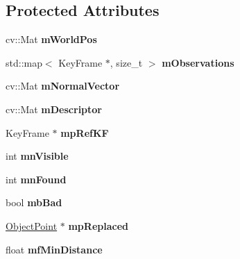 \subsection*{Protected Attributes}
\begin{DoxyCompactItemize}
\item 
\mbox{\label{classObjectPoint_ad860667222a3669a8feccb9ff73b2556}} 
cv\+::\+Mat {\bfseries m\+World\+Pos}
\item 
\mbox{\label{classObjectPoint_a62aca927653d3591f1211ccc06a6cffa}} 
std\+::map$<$ Key\+Frame $\ast$, size\+\_\+t $>$ {\bfseries m\+Observations}
\item 
\mbox{\label{classObjectPoint_a86e5ecd275a9594f8b72c35cb9735195}} 
cv\+::\+Mat {\bfseries m\+Normal\+Vector}
\item 
\mbox{\label{classObjectPoint_a3cf257ac63232c6dbd992defe6d16875}} 
cv\+::\+Mat {\bfseries m\+Descriptor}
\item 
\mbox{\label{classObjectPoint_a43e976a71483d1700aa48013874409dd}} 
Key\+Frame $\ast$ {\bfseries mp\+Ref\+KF}
\item 
\mbox{\label{classObjectPoint_a9465a617bd9530427916b13acdf85c46}} 
int {\bfseries mn\+Visible}
\item 
\mbox{\label{classObjectPoint_acc0516cd3cc04291894c1d545d2f68be}} 
int {\bfseries mn\+Found}
\item 
\mbox{\label{classObjectPoint_ae98d104a2a5e64058103a971018b03d7}} 
bool {\bfseries mb\+Bad}
\item 
\mbox{\label{classObjectPoint_ad9fd3f0350b803aabb35f69b701f1ec2}} 
\hyperlink{classObjectPoint}{Object\+Point} $\ast$ {\bfseries mp\+Replaced}
\item 
\mbox{\label{classObjectPoint_a5024e4350beea8ada14797e318fafe16}} 
float {\bfseries mf\+Min\+Distance}
\item 
\mbox{\label{classObjectPoint_abf9914881a4b29e2f0c1e50f2bf9bf97}} 

\end{DoxyCompactItemize}
